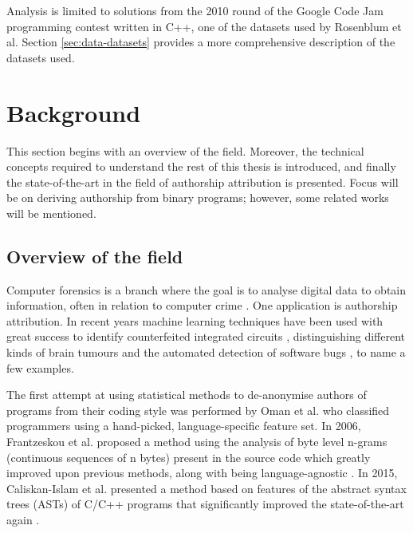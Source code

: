 \documentclass[a4paper,11pt]{kth-mag}
\begin{document}
Analysis is limited to solutions from the 2010 round of the Google Code Jam
programming contest written in C++, one of the datasets used by Rosenblum et
al. Section \ref{sec:data-datasets} provides a more comprehensive description
of the datasets used.

\chapter{Background}
This section begins with an overview of the field. Moreover, the
technical concepts required to understand the rest of this thesis is introduced, and finally
the state-of-the-art in the field of authorship attribution is presented. Focus will
be on deriving authorship from binary programs; however, some related works
will be mentioned.

\section{Overview of the field}
Computer forensics is a branch where the goal is to analyse digital data to
obtain information, often in relation to computer crime
\parencite{reith2002examination}. One application is authorship attribution. In
recent years machine learning techniques have been used with great success to
identify counterfeited integrated circuits \parencite{huang2013counterfeit},
distinguishing different kinds of brain tumours
\parencite{zacharaki2009classification} and the automated detection of software
bugs \parencite{aleem2015comparative}, to name a few examples.

The first attempt at using statistical methods to de-anonymise authors of
programs from their coding style was performed by Oman et al.
\parencite{oman1989programming} who classified programmers using a hand-picked,
language-specific feature set. In 2006, Frantzeskou et al. proposed a method
using the analysis of byte level n-grams (continuous sequences of n bytes)
present in the source code which greatly improved upon previous methods, along
with being language-agnostic \parencite{frantzeskou2006source}. In 2015,
Caliskan-Islam et al. presented a method based on features of the abstract
syntax trees (ASTs) of C/C++ programs that significantly improved the
state-of-the-art again \parencite{caliskan2015anonymizing}.
 
\end{document}
